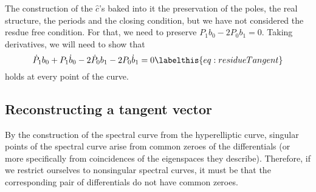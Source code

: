 The construction of the $\hat{c}$'s baked into it the preservation of the poles, the real structure, the periods and the closing condition, but we have not considered the resdue free condition. For that, we need to preserve $P_1b_0 - 2P_0b_1 = 0$. Taking derivatives, we will need to show that
\[
\dot{P}_1 b_0 + P_1 \dot{b}_0 - 2 \dot{P}_0 b_1 - 2 P_0 \dot{b}_1 = 0 \labelthis{eq:residueTangent}
\]
holds at every point of the curve.















\subsection{Reconstructing a tangent vector}
By the construction of the spectral curve from the hyperelliptic curve, singular points of the spectral curve arise from common zeroes of the differentials (or more specifically from coincidences of the eigenspaces they describe). Therefore, if we restrict ourselves to nonsingular spectral curves, it must be that the corresponding pair of differentials do not have common zeroes.

